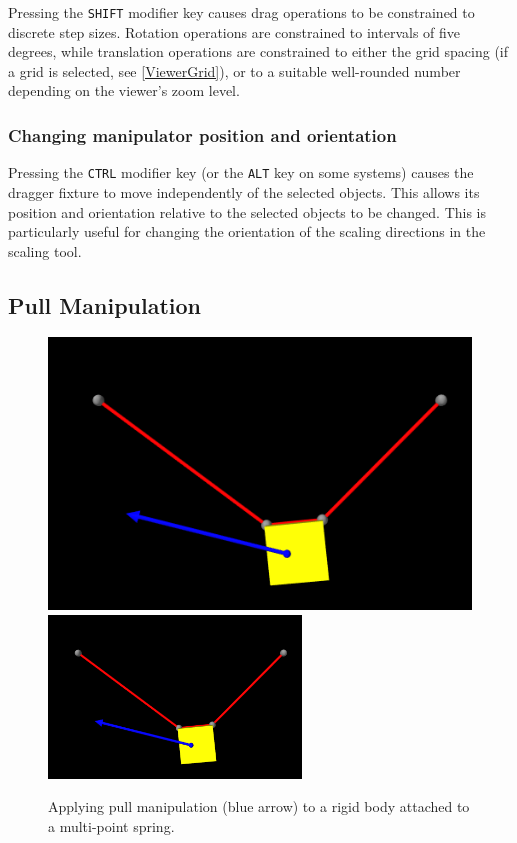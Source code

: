 \documentclass{article}
\begin{document}
Pressing the {\tt SHIFT} modifier key causes drag operations to be
constrained to discrete step sizes. Rotation operations are
constrained to intervals of five degrees, while translation operations
are constrained to either the grid spacing (if a grid is selected, see
\ref{ViewerGrid}), or to a suitable well-rounded number depending on
the viewer's zoom level.

\subsubsection{Changing manipulator position and orientation}
\label{ChangingManipulatorPose}

Pressing the {\tt CTRL} modifier key (or the {\tt ALT} key on some
systems) causes the dragger fixture to move independently of the
selected objects. This allows its position and orientation relative to
the selected objects to be changed. This is particularly useful for
changing the orientation of the scaling directions in the scaling
tool.

\subsection{Pull Manipulation}
\label{PullManipulationSec}

\begin{figure}
\begin{center}
\iflatexml
\includegraphics[]{images/pullManipulation}
\else
\includegraphics[width=0.6\textwidth]{images/pullManipulation}
\fi
\end{center}
\caption{Applying pull manipulation (blue arrow) to a rigid body 
attached to a multi-point spring.}%
\label{PullManipulationFig}
\end{figure}
\end{document}
